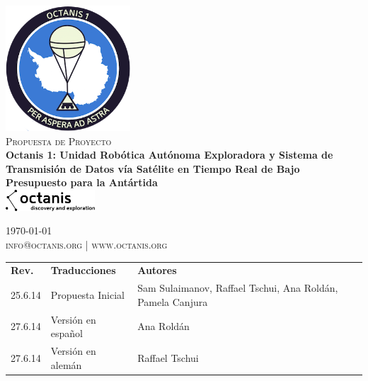 \documentclass[a4paper,12pt]{article}
\begin{document}
\begin{titlepage}
\begin{center}

\includegraphics[width=0.35\textwidth]{patch}~\\[2cm]

\textsc{\Large Propuesta de Proyecto}\\[0.5cm]

\huge \bfseries Octanis 1: Unidad Robótica Autónoma Exploradora y Sistema de Transmisión de Datos vía Satélite en Tiempo Real de Bajo Presupuesto para la Antártida \\[0.4cm] 

\vspace{23pt}
\includegraphics[width=0.25\textwidth]{black_logo} \\
\vfill

{\large \today} \\
\textsc{\small info@octanis.org | www.octanis.org}
\vspace{50pt}


\begin{table}[h!]
\centering
\vspace{1pt}
\begin{tabular}{ l  l  l }
	\textbf{Rev.} & \textbf{Traducciones} & \textbf{Autores} \\
	25.6.14 & Propuesta Inicial & Sam Sulaimanov, Raffael Tschui, Ana Roldán, Pamela Canjura \\
	27.6.14 & Versión en español & Ana Roldán \\
	27.6.14 & Versión en alemán & Raffael Tschui \\
\end{tabular}
\end{table}

\end{center}
\end{titlepage}
\end{document}
